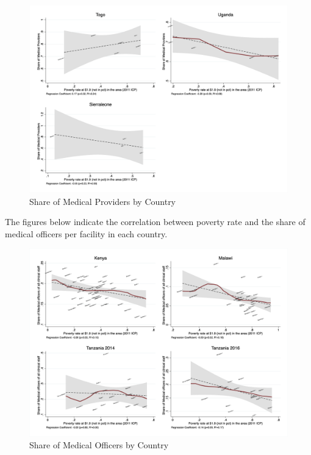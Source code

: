 \documentclass{article}                 %
\begin{document}
			\begin{figure}[H] 
				\centering
				\caption{Share of Medical Providers by Country} 
				\includegraphics[width=\textwidth]{"../Output/Final/poverty_fl_3"}
			\end{figure}
	
	The figures below indicate the correlation between poverty rate and the share of medical officers per facility in each country.
	
			\begin{figure}[H] 
				\centering
				\caption{Share of Medical Officers by Country} 
				\includegraphics[width=\textwidth]{"../Output/Final/poverty_fl_1_medoff"}
			\end{figure}
			
\end{document}
